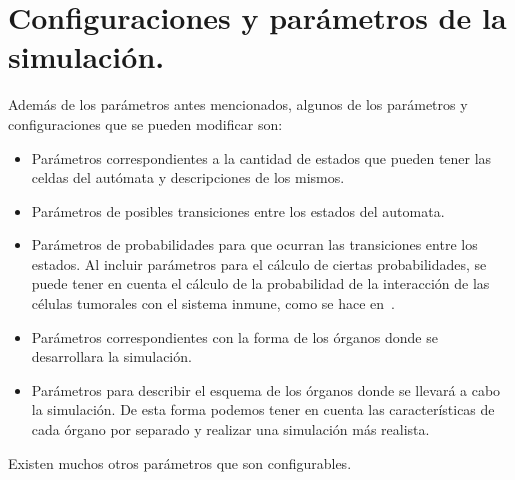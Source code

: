\section{Configuraciones y par\'ametros de la simulaci\'on.}

Adem\'as de los par\'ametros antes mencionados, algunos de los par\'ametros y configuraciones que se pueden modificar son:
\begin{itemize}
    \item Par\'ametros correspondientes a la cantidad de estados que pueden tener las celdas del aut\'omata y descripciones de los mismos.
    \item Par\'ametros de posibles transiciones entre los estados del automata.
    \item Par\'ametros de probabilidades para que ocurran las transiciones entre los estados. Al incluir par\'ametros para el c\'alculo de ciertas probabilidades, se puede tener en cuenta el c\'alculo de la probabilidad de la interacci\'on de las c\'elulas tumorales con el sistema inmune, como se hace en~\cite{ruanxiaoca}.
    \item Par\'ametros correspondientes con la forma de los \'organos donde se desarrollara la simulaci\'on.
    \item Par\'ametros para describir el esquema de los \'organos donde se llevar\'a a cabo la simulaci\'on. De esta forma podemos tener en cuenta las caracter\'isticas de cada \'organo por separado y realizar una simulaci\'on m\'as realista.
\end{itemize}

Existen muchos otros par\'ametros que son configurables.\\

